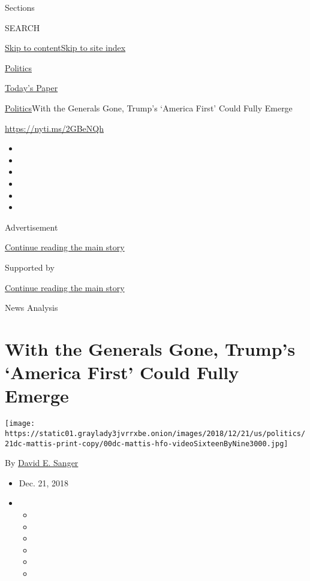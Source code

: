 Sections

SEARCH

\protect\hyperlink{site-content}{Skip to
content}\protect\hyperlink{site-index}{Skip to site index}

\href{https://www.nytimes3xbfgragh.onion/section/politics}{Politics}

\href{https://myaccount.nytimes3xbfgragh.onion/auth/login?response_type=cookie\&client_id=vi}{}

\href{https://www.nytimes3xbfgragh.onion/section/todayspaper}{Today's
Paper}

\href{/section/politics}{Politics}\textbar{}With the Generals Gone,
Trump's `America First' Could Fully Emerge

\url{https://nyti.ms/2GBeNQh}

\begin{itemize}
\item
\item
\item
\item
\item
\item
\end{itemize}

Advertisement

\protect\hyperlink{after-top}{Continue reading the main story}

Supported by

\protect\hyperlink{after-sponsor}{Continue reading the main story}

News Analysis

\hypertarget{with-the-generals-gone-trumps-america-first-could-fully-emerge}{%
\section{With the Generals Gone, Trump's `America First' Could Fully
Emerge}\label{with-the-generals-gone-trumps-america-first-could-fully-emerge}}

\texttt{[image: https://static01.graylady3jvrrxbe.onion/images/2018/12/21/us/politics/21dc-mattis-print-copy/00dc-mattis-hfo-videoSixteenByNine3000.jpg]}

By \href{https://www.nytimes3xbfgragh.onion/by/david-e-sanger}{David E.
Sanger}

\begin{itemize}
\item
  Dec. 21, 2018
\item
  \begin{itemize}
  \item
  \item
  \item
  \item
  \item
  \item
  \end{itemize}
\end{itemize}

